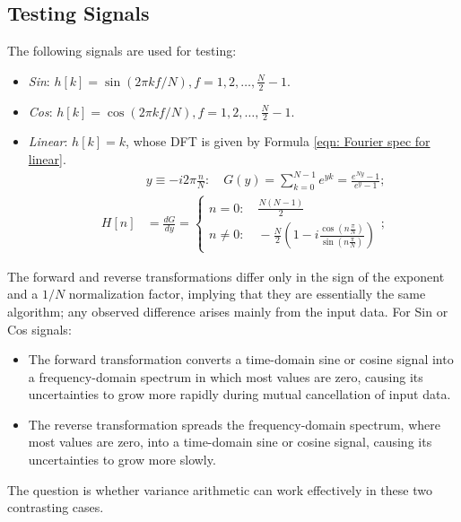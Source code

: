 \documentclass[twoside]{article}
\numberwithin{equation}{section}
\begin{document}
 

\subsection{Testing Signals}



The following signals are used for testing:
\begin{itemize}
\item \emph{Sin}: $h[k] = \sin(2\pi k f/N), f = 1, 2, \dots, \frac{N}{2} -1$.

\item \emph{Cos}: $h[k] = \cos(2\pi k f/N), f = 1, 2, \dots, \frac{N}{2} -1$.

\item \emph{Linear}: $h[k] = k$, whose DFT is given by Formula \eqref{eqn: Fourier spec for linear}.
\begin{align}
& y \equiv -i 2\pi \frac{n}{N}: \quad G(y) = \sum_{k=0}^{N-1}  e^{y k} = \frac{e^{N y} - 1}{e^y - 1}; \nonumber \\
\label{eqn: Fourier spec for linear}
H[n] &= \frac{d G}{d y} = \begin{cases} n = 0: \quad \frac{N (N-1)}{2} \\ n \neq 0: \quad
 - \frac{N}{2}(1 - i \frac{\cos(n \frac{\pi}{N})}{\sin(n \frac{\pi}{N})}) \end{cases};
\end{align}

\end{itemize}
The forward and reverse transformations differ only in the sign of the exponent and a $1/N$ normalization factor, implying that they are essentially the same algorithm; any observed difference arises mainly from the input data.
For Sin or Cos signals:
\begin{itemize}
\item The forward transformation converts a time-domain sine or cosine signal into a frequency-domain spectrum in which most values are zero, causing its uncertainties to grow more rapidly during mutual cancellation of input data. 

\item The reverse transformation spreads the frequency-domain spectrum, where most values are zero, into a time-domain sine or cosine signal, causing its uncertainties to grow more slowly. 
\end{itemize}
The question is whether variance arithmetic can work effectively in these two contrasting cases.
\end{document}

